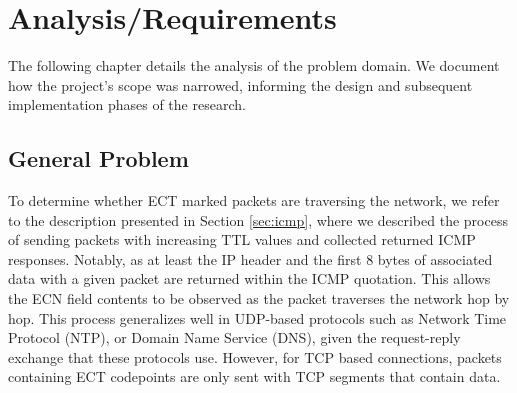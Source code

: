 \documentclass{l4proj}
\begin{document}






\chapter{Analysis/Requirements}
\label{chap:analysis}

The following chapter details the analysis of the problem domain. We document how the project's scope was narrowed, informing the design and subsequent implementation phases of the research.

\section{General Problem}


To determine whether ECT marked packets are traversing the network, we refer to the description presented in Section \ref{sec:icmp}, where we described the process of sending packets with increasing TTL values and collected returned ICMP responses. Notably, as at least the IP header and the first 8 bytes of associated data with a given packet are returned within the ICMP quotation. This allows the ECN field contents to be observed as the packet traverses the network hop by hop. This process generalizes well in UDP-based protocols such as Network Time Protocol (NTP), or Domain Name Service (DNS), given the request-reply exchange that these protocols use. However, for TCP based connections, packets containing ECT codepoints are only sent with TCP segments that contain data.
\end{document}

